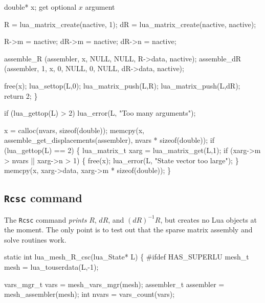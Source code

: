    double* x;
    \LA{}get optional $x$ argument~{\nwtagstyle{}}\RA{}

    R  = lua_matrix_create(nactive, 1);
    dR = lua_matrix_create(nactive, nactive);

    R->m  = nactive;
    dR->m = nactive;
    dR->n = nactive;

    assemble_R   (assembler, x, NULL, NULL, R->data, nactive);
    assemble_dR  (assembler, 1, x, 0, NULL, 0, NULL, dR->data, nactive);

    free(x);
    lua_settop(L,0);
    lua_matrix_push(L,R);
    lua_matrix_push(L,dR);
    return 2;
\}

\nwendcode{}\nwdocspar

\nwenddocs{}\endmoddef
if (lua_gettop(L) > 2)
    lua_error(L, "Too many arguments");

x = calloc(nvars, sizeof(double));
memcpy(x, assemble_get_displacements(assembler), nvars * sizeof(double));
if (lua_gettop(L) == 2) \{
    lua_matrix_t xarg = lua_matrix_get(L,1);
    if (xarg->m > nvars || xarg->n > 1) \{
        free(x);
        lua_error(L, "State vector too large");
    \}
    memcpy(x, xarg->data, xarg->m * sizeof(double));
\}
\nwendcode{}\nwdocspar


\subsection{{\tt{}R{}csc} command}

The {\tt{}R{}csc} command \emph{prints} $R$, $dR$, and $(dR)^{-1} R$,
but creates no Lua objects at the moment.  The only point is to test
out that the sparse matrix assembly and solve routines work.

\nwenddocs{}\plusendmoddef
static int lua_mesh_R_csc(lua_State* L)
\{
#ifdef HAS_SUPERLU
    mesh_t mesh = lua_touserdata(L,-1);

    vars_mgr_t  vars      = mesh_vars_mgr(mesh);
    assembler_t assembler = mesh_assembler(mesh);
    int         nvars     = vars_count(vars);

